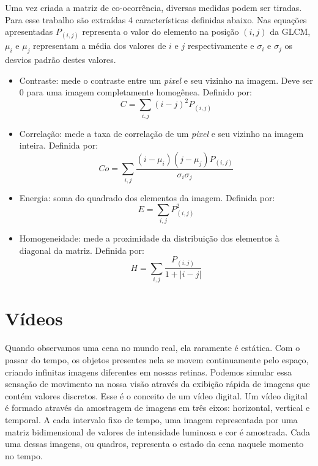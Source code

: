 Uma vez criada a matriz de co-ocorrência, diversas medidas podem ser tiradas. Para esse trabalho são extraídas 4 características definidas abaixo. Nas equações apresentadas $P_{(i,j)}$ representa o valor do elemento na posição $(i,j)$ da GLCM, $\mu_i$ e $\mu_j$ representam a média dos valores de $i$ e $j$ respectivamente e $\sigma_i$ e $\sigma_j$ os desvios padrão destes valores.

\begin{itemize}

\item Contraste: mede o contraste entre um \textit{pixel} e seu vizinho na imagem. Deve ser 0 para uma imagem completamente homogênea. Definido por:
	\begin{equation}
		C = \sum_{i,j} (i-j)^{2}P_{(i,j)}
	\end{equation}
	
\item Correlação: mede a taxa de correlação de um \textit{pixel} e seu vizinho na imagem inteira. Definida por:
	\begin{equation}
		Co = \sum_{i,j} \frac{(i - \mu_i)(j - \mu_j)P_{(i,j)}}{\sigma_i\sigma_j}
	\end{equation}
	
\item Energia: soma do quadrado dos elementos da imagem. Definida por:
	\begin{equation}
		E = \sum_{i,j} P_{(i,j)}^{2}
	\end{equation}
	
\item Homogeneidade: mede a proximidade da distribuição dos elementos à diagonal da matriz. Definida por:
	\begin{equation}
		H = \sum_{i,j} \frac{P_{(i,j)}}{1+|i-j|}
	\end{equation}
\end{itemize}


\section{Vídeos}\label{sec:video}


Quando observamos uma cena no mundo real, ela raramente é estática. Com o passar do tempo, os objetos presentes nela se movem continuamente pelo espaço, criando infinitas imagens diferentes em nossas retinas. Podemos simular essa sensação de movimento na nossa visão através da exibição rápida de imagens que contém valores discretos. Esse é o conceito de um vídeo digital. Um vídeo digital é formado através da amostragem de imagens	em três eixos: horizontal, vertical e temporal\cite{LivroVideoDigital}. A cada intervalo fixo de tempo, uma imagem representada por uma matriz bidimensional de valores de intensidade luminosa e cor é amostrada. Cada uma dessas imagens, ou quadros, representa o estado da cena naquele momento no tempo.

